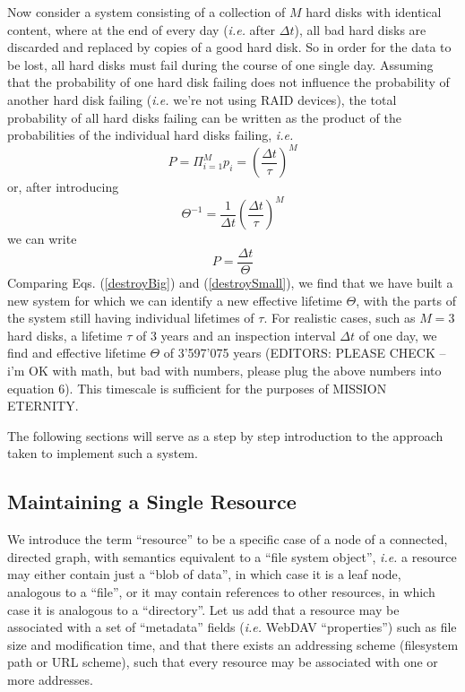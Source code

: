 \documentclass[11pt]{article}
\begin{document}
\begin{mainmatter}
Now consider a system consisting of a collection of $M$ hard disks with identical content, where at the end of every day (\emph{i.e.} after $\Delta t$), all bad hard disks are discarded and replaced by copies of a good hard disk. So in order for the data to be lost, all hard disks must fail during the course of one single day. Assuming that the probability of one hard disk failing does not influence the probability of another hard disk failing (\emph{i.e.} we're not using RAID devices), the total probability of all hard disks failing can be written as the product of the probabilities of the individual hard disks failing, \emph{i.e.}
\begin{equation}
P = \Pi_{i = 1}^M p_i = \left(\frac{\Delta t}{\tau}\right)^M
\end{equation}
or, after introducing
\begin{equation}
\Theta^{-1} = \frac{1}{\Delta t} \left(\frac{\Delta t}{\tau}\right)^M
\end{equation}
we can write
\begin{equation}
P =  \frac{\Delta t}{\Theta}
\label{destroyBig}
\end{equation}
Comparing Eqs. (\ref{destroyBig}) and (\ref{destroySmall}), we find that we have built a new system for which we can identify a new effective lifetime $\Theta$, with the parts of the system still having individual lifetimes of $\tau$. For realistic cases, such as $M = 3$ hard disks, a lifetime $\tau$ of 3 years and an inspection interval $\Delta t$ of one day, we find and effective lifetime $\Theta$ of 3'597'075 years (EDITORS: PLEASE CHECK -- i'm OK with math, but bad with numbers, please plug the above numbers into equation 6). This timescale is sufficient for the purposes of MISSION ETERNITY.

The following sections will serve as a step by step introduction to the approach taken to implement such a system.


\subsection{Maintaining a Single Resource}

We introduce the term ``resource'' to be a specific case of a node of a connected, directed graph, with semantics equivalent to a ``file system object'', \emph{i.e.} a resource may either contain just a ``blob of data'', in which case it is a leaf node, analogous to a ``file'', or it may contain references to other resources, in which case it is analogous to a ``directory''. Let us add that a resource may be associated with a set of ``metadata'' fields (\emph{i.e.} WebDAV ``properties'') such as file size and modification time, and that there exists an addressing scheme (filesystem path or URL scheme), such that every resource may be associated with one or more addresses.


\end{mainmatter}
\end{document}
